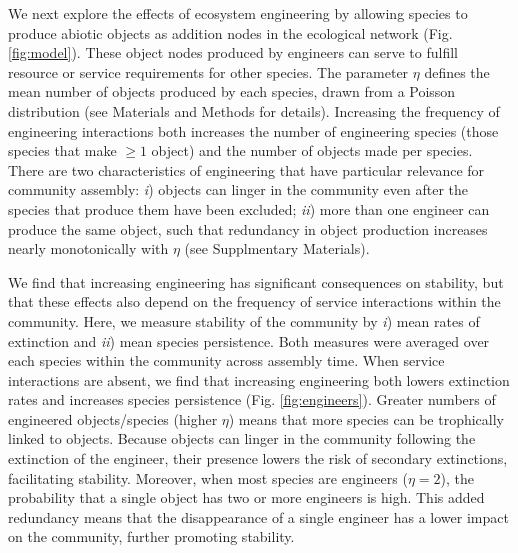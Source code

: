 \documentclass[9pt,twocolumn,twoside]{pnas-new}
\begin{document}
We next explore the effects of ecosystem engineering by allowing species to produce abiotic objects as addition nodes in the ecological network (Fig. \ref{fig:model}).
These object nodes produced by engineers can serve to fulfill resource or service requirements for other species.
The parameter $\eta$ defines the mean number of objects produced by each species, drawn from a Poisson distribution (see Materials and Methods for details).
Increasing the frequency of engineering interactions both increases the number of engineering species (those species that make $\geq 1$ object) and the number of objects made per species.
There are two characteristics of engineering that have particular relevance for community assembly:
\emph{i}) objects can linger in the community even after the species that produce them have been excluded;
\emph{ii}) more than one engineer can produce the same object, such that redundancy in object production increases nearly monotonically with $\eta$ (see Supplmentary Materials).






We find that increasing engineering has significant consequences on stability, but that these effects also depend on the frequency of service interactions within the community.
Here, we measure stability of the community by 
\emph{i}) mean rates of extinction and
\emph{ii}) mean species persistence.
Both measures were averaged over each species within the community across assembly time.
When service interactions are absent, we find that increasing engineering both lowers extinction rates and increases species persistence (Fig. \ref{fig:engineers}).
Greater numbers of engineered objects/species (higher $\eta$) means that more species can be trophically linked to objects.
Because objects can linger in the community following the extinction of the engineer, their presence lowers the risk of secondary extinctions, facilitating stability.
Moreover, when most species are engineers ($\eta = 2$), the probability that a single object has two or more engineers is high.
This added redundancy means that the disappearance of a single engineer has a lower impact on the community, further promoting stability.
\end{document}
